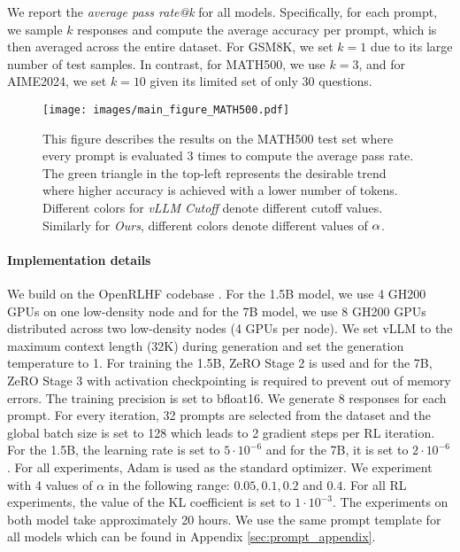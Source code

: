 We report the \emph{average pass rate@k} for all models. Specifically, for each prompt, we sample \( k \) responses and compute the average accuracy per prompt, which is then averaged across the entire dataset. For GSM8K, we set \( k=1 \) due to its large number of test samples. In contrast, for MATH500, we use \( k=3 \), and for AIME2024, we set \( k=10 \) given its limited set of only 30 questions.

\begin{figure*}[ht!]
\centering
  \texttt{[image: images/main\_figure\_MATH500.pdf]}
  \vspace{-1em}
  \caption{This figure describes the results on the MATH500 test set where every prompt is evaluated 3 times to compute the average pass rate. The green triangle in the top-left represents the desirable trend where higher accuracy is achieved with a lower number of tokens. Different colors for \emph{vLLM Cutoff} denote different cutoff values. Similarly for \emph{Ours}, different colors denote different values of $\alpha$.}
  \label{fig:main_results_math}
\end{figure*}


\paragraph{Implementation details}
We build on the OpenRLHF codebase \cite{hu2024openrlhfeasytousescalablehighperformance}. For the 1.5B model, we use 4 GH200 GPUs on one low-density node and for the 7B model, we use 8 GH200 GPUs distributed across two low-density nodes (4 GPUs per node). We set vLLM to the maximum context length (32K) during generation and set the generation temperature to 1. For training the 1.5B, ZeRO Stage 2 \cite{rajbhandari2020zeromemoryoptimizationstraining} is used and for the 7B, ZeRO Stage 3 with activation checkpointing is required to prevent out of memory errors. The training precision is set to bfloat16. We generate 8 responses for each prompt. For every iteration, 32 prompts are selected from the dataset and the global batch size is set to 128 which leads to 2 gradient steps per RL iteration. For the 1.5B, the learning rate is set to $5\cdot10^{-6}$ and for the 7B, it is set to $2\cdot10^{-6}$. For all experiments, Adam \cite{kingma2017adammethodstochasticoptimization} is used as the standard optimizer. We experiment with 4 values of $\alpha$ in the following range: $0.05, 0.1, 0.2$ and $0.4$. For all RL experiments, the value of the KL coefficient is set to $1\cdot 10^{-3}$. The experiments on both model take approximately 20 hours. We use the same prompt template for all models which can be found in Appendix \ref{sec:prompt_appendix}.


